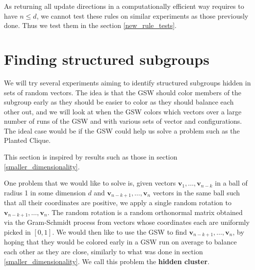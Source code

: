 \documentclass[12pt]{article}
\begin{document}
As returning all update directions in a computationally efficient way requires to have $n\leq d$, we cannot test these rules on similar experiments as those previously done. Thus we test them in the section \ref{new_rule_tests}.

\section{Finding structured subgroups}\label{structured_subgroups}
We will try several experiments aiming to identify structured subgroups hidden in sets of random vectors. The idea is that the GSW should color members of the subgroup early as they should be easier to color as they should balance each other out, and we will look at when the GSW colors which vectors over a large number of runs of the GSW and with various sets of vector and configurations. The ideal case would be if the GSW could help us solve a problem such as the Planted Clique.

This section is inspired by results such as those in section \ref{smaller_dimensionality}.

One problem that we would like to solve is, given vectors $\textbf{v}_1,\dots,\textbf{v}_{n-k}$ in a ball of radius 1 in some dimension $d$ and $\textbf{v}_{n-k+1},\dots,\textbf{v}_n$ vectors in the same ball such that all their coordinates are positive, we apply a single random rotation to $\textbf{v}_{n-k+1},\dots,\textbf{v}_n$. The random rotation is a random orthonormal matrix obtained via the Gram-Schmidt process from vectors whose coordinates each are uniformly picked in $[0,1]$. We would then like to use the GSW to find $\textbf{v}_{n-k+1},\dots,\textbf{v}_n$, by hoping that they would be colored early in a GSW run on average to balance each other as they are close, similarly to what was done in section \ref{smaller_dimensionality}. We call this problem the \textbf{hidden cluster}.
\end{document}
